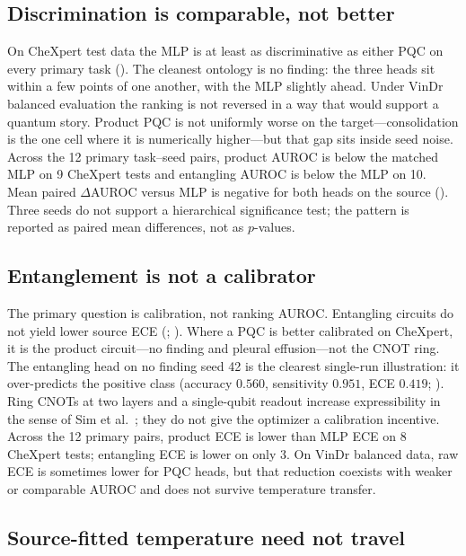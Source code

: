 \documentclass{midl} %
\begin{document}
\subsection{Discrimination is comparable, not better}

On CheXpert test data the MLP is at least as discriminative as either PQC on every primary task (). The cleanest ontology is no finding: the three heads sit within a few points of one another, with the MLP slightly ahead. Under VinDr balanced evaluation the ranking is not reversed in a way that would support a quantum story. Product PQC is not uniformly worse on the target---consolidation is the one cell where it is numerically higher---but that gap sits inside seed noise. Across the 12 primary task--seed pairs, product AUROC is below the matched MLP on 9 CheXpert tests and entangling AUROC is below the MLP on 10. Mean paired $\Delta$AUROC versus MLP is negative for both heads on the source (). Three seeds do not support a hierarchical significance test; the pattern is reported as paired mean differences, not as $p$-values.

\subsection{Entanglement is not a calibrator}

The primary question is calibration, not ranking AUROC. Entangling circuits do not yield lower source ECE (; ). Where a PQC is better calibrated on CheXpert, it is the product circuit---no finding and pleural effusion---not the CNOT ring. The entangling head on no finding seed 42 is the clearest single-run illustration: it over-predicts the positive class (accuracy $0.560$, sensitivity $0.951$, ECE $0.419$; ). Ring CNOTs at two layers and a single-qubit readout increase expressibility in the sense of Sim et al.\ \cite{sim2019expressibility}; they do not give the optimizer a calibration incentive. Across the 12 primary pairs, product ECE is lower than MLP ECE on 8 CheXpert tests; entangling ECE is lower on only 3. On VinDr balanced data, raw ECE is sometimes lower for PQC heads, but that reduction coexists with weaker or comparable AUROC and does not survive temperature transfer.

\subsection{Source-fitted temperature need not travel}
\end{document}
